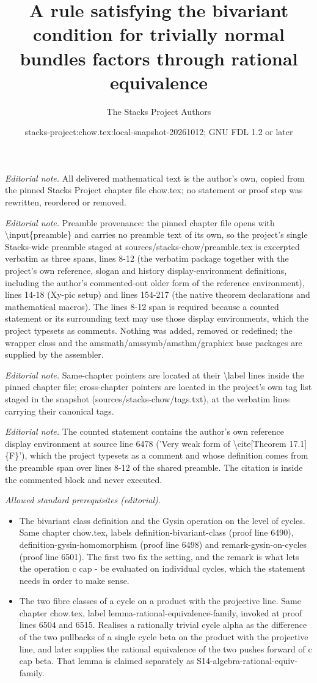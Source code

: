 \documentclass[10pt,a4paper]{amsart}
\title{A rule satisfying the bivariant condition for trivially normal bundles factors through rational equivalence}
\author{The Stacks Project Authors}
\date{stacks-project:chow.tex:local-snapshot-20261012; GNU FDL 1.2 or later}
\theoremstyle{plain}
\theoremstyle{definition}
\theoremstyle{remark}
\numberwithin{equation}{subsection}
\begin{document}
\maketitle
\noindent\textit{Editorial note.} All delivered mathematical text is the author's own, copied from the pinned Stacks Project chapter file chow.tex; no statement or proof step was rewritten, reordered or removed.\par\medskip
\noindent\textit{Editorial note.} Preamble provenance: the pinned chapter file opens with \textbackslash{}input\{preamble\} and carries no preamble text of its own, so the project's single Stacks-wide preamble staged at sources/stacks-chow/preamble.tex is excerpted verbatim as three spans, lines 8-12 (the verbatim package together with the project's own reference, slogan and history display-environment definitions, including the author's commented-out older form of the reference environment), lines 14-18 (Xy-pic setup) and lines 154-217 (the native theorem declarations and mathematical macros). The lines 8-12 span is required because a counted statement or its surrounding text may use those display environments, which the project typesets as comments. Nothing was added, removed or redefined; the wrapper class and the amsmath/amssymb/amsthm/graphicx base packages are supplied by the assembler.\par\medskip
\noindent\textit{Editorial note.} Same-chapter pointers are located at their \textbackslash{}label lines inside the pinned chapter file; cross-chapter pointers are located in the project's own tag list staged in the snapshot (sources/stacks-chow/tags.txt), at the verbatim lines carrying their canonical tags.\par\medskip
\noindent\textit{Editorial note.} The counted statement contains the author's own reference display environment at source line 6478 ('Very weak form of \textbackslash{}cite[Theorem 17.1]\{F\}'), which the project typesets as a comment and whose definition comes from the preamble span over lines 8-12 of the shared preamble. The citation is inside the commented block and never executed.\par\medskip
\noindent\textit{Allowed standard prerequisites (editorial).}\begin{itemize}
\item The bivariant class definition and the Gysin operation on the level of cycles. Same chapter chow.tex, labels definition-bivariant-class (proof line 6490), definition-gysin-homomorphism (proof line 6498) and remark-gysin-on-cycles (proof line 6501). The first two fix the setting, and the remark is what lets the operation c cap - be evaluated on individual cycles, which the statement needs in order to make sense.
\item The two fibre classes of a cycle on a product with the projective line. Same chapter chow.tex, label lemma-rational-equivalence-family, invoked at proof lines 6504 and 6515. Realises a rationally trivial cycle alpha as the difference of the two pullbacks of a single cycle beta on the product with the projective line, and later supplies the rational equivalence of the two pushes forward of c cap beta. That lemma is claimed separately as S14-algebra-rational-equiv-family.
\end{itemize}\medskip
\end{document}
